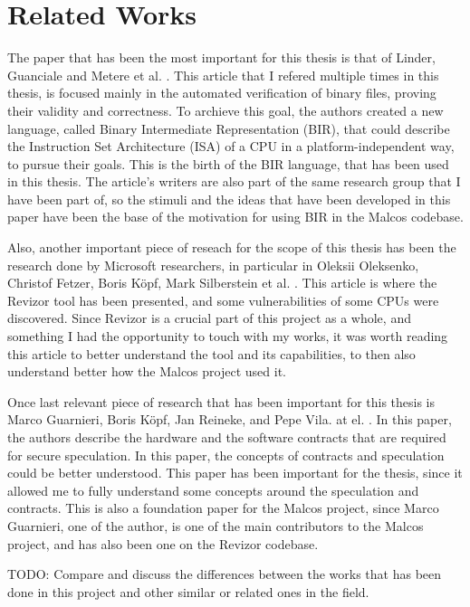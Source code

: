 \chapter{Related Works}
\label{cha:related_works}The paper that has been the most important for this
thesis is that of Linder, Guanciale and Metere et al. \cite{bir_pub}. This article
that I refered multiple times in this thesis, is focused mainly in the automated
verification of binary files, proving their validity and correctness. To
archieve this goal, the authors created a new language, called Binary
Intermediate Representation (BIR), that could describe the Instruction Set Architecture
(ISA) of a CPU in a platform-independent way, to pursue their goals. This is the
birth of the BIR language, that has been used in this thesis. The article's writers
are also part of the same research group that I have been part of, so the
stimuli and the ideas that have been developed in this paper have been the base
of the motivation for using BIR in the Malcos codebase.

Also, another important piece of reseach for the scope of this thesis has been the
research done by Microsoft researchers, in particular in Oleksii Oleksenko, Christof
Fetzer, Boris Köpf, Mark Silberstein et al. \cite{article}. This article is where
the Revizor tool has been presented, and some vulnerabilities of some CPUs were
discovered. Since Revizor is a crucial part of this project as a whole, and
something I had the opportunity to touch with my works, it was worth reading this
article to better understand the tool and its capabilities, to then also
understand better how the Malcos project used it.

Once last relevant piece of research that has been important for this thesis is
Marco Guarnieri, Boris Köpf, Jan Reineke, and Pepe Vila. at el. \cite{contracts_paper}.
In this paper, the authors describe the hardware and the software contracts that
are required for secure speculation. In this paper, the concepts of contracts and
speculation could be better understood. This paper has been important for the
thesis, since it allowed me to fully understand some concepts around the speculation
and contracts. This is also a foundation paper for the Malcos project, since Marco
Guarnieri, one of the author, is one of the main contributors to the Malcos project,
and has also been one on the Revizor codebase.

TODO: Compare and discuss the differences between the works that has been done in
this project and other similar or related ones in the field.